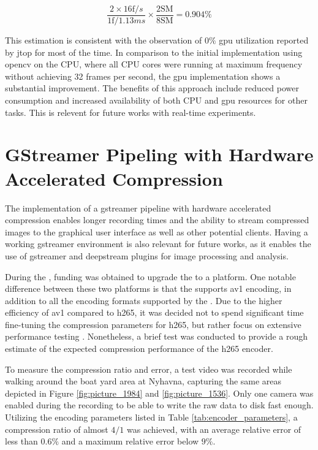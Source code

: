 \begin{equation}
    \frac{2 \times 16 \text{f}/s}{1 \text{f} / 1.13ms} \times \frac{2 \text{SM}}{8 \text{SM}} = 0.904\%
\end{equation}


This estimation is consistent with the observation of $0\%$ \gls{gpu} utilization reported by \gls{jtop} for most of the time. In comparison to the initial implementation using \gls{opencv} on the CPU, where all CPU cores were running at maximum frequency without achieving 32 frames per second, the \gls{gpu} implementation shows a substantial improvement. The benefits of this approach include reduced power consumption and increased availability of both CPU and \gls{gpu} resources for other tasks.
This is relevent for future works with real-time experiments.

\section{GStreamer Pipeling with Hardware Accelerated Compression}
The implementation of a \gls{gstreamer} pipeline with hardware accelerated compression enables longer recording times and the ability to stream compressed images to the graphical user interface as well as other potential clients.
Having a working \gls{gstreamer} environment is also relevant for future works, as it enables the use of \gls{gstreamer} and \gls{deepstream} plugins for image processing and analysis.

During the \master, funding was obtained to upgrade the \jx to a \jo platform.
One notable difference between these two platforms is that the \jo supports \gls{av1} encoding, in addition to all the encoding formats supported by the \jx \cite{karumbunathanNVIDIAJetsonAGX2022}.
Due to the higher efficiency of \gls{av1} compared to \gls{h265}, it was decided not to spend significant time fine-tuning the compression parameters for \gls{h265}, but rather focus on extensive performance testing \cite{torresAV1VsHEVC2022}.
Nonetheless, a brief test was conducted to provide a rough estimate of the expected compression performance of the \gls{h265} encoder.

To measure the compression ratio and error, a test video was recorded while walking around the boat yard area at Nyhavna, capturing the same areas depicted in Figure \ref{fig:picture_1984} and \ref{fig:picture_1536}.
Only one camera was enabled during the recording to be able to write the raw data to disk fast enough.
Utilizing the encoding parameters listed in Table \ref{tab:encoder_parameters}, a compression ratio of almost $4/1$ was achieved, with an average relative error of less than $0.6\%$ and a maximum relative error below $9\%$.

